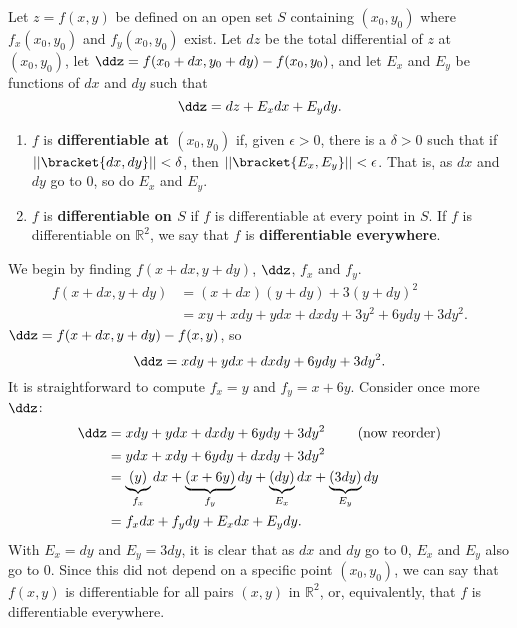 {Let $z=f(x,y)$ be defined on an open set $S$ containing $(x_0,y_0)$ where $f_x(x_0,y_0)$ and $f_y(x_0,y_0)$ exist. Let $dz$ be the total differential of $z$ at $(x_0,y_0)$, let $\ddz = f(x_0+dx,y_0+dy) - f(x_0,y_0)$, and let $E_x$ and $E_y$ be functions of $dx$ and $dy$  such that 
$$\ddz = dz + E_xdx + E_ydy.$$
\begin{enumerate}
	\item $f$ is \textbf{differentiable at $(x_0,y_0)$} if, given $\epsilon >0$, there is a $\delta >0$ such that if $||\bracket{dx,dy}|| < \delta$, then $||\bracket{E_x,E_y}|| < \epsilon$. That is, as $dx$ and $dy$ go to 0, so do $E_x$ and $E_y$.
	\item	$f$ is \textbf{differentiable on $S$} if $f$ is differentiable at every point in $S$. If $f$ is differentiable on $\mathbb{R}^2$, we say that $f$ is \textbf{differentiable everywhere}.
\end{enumerate}
}

{We begin by finding $f(x+dx,y+dy)$, $\ddz$, $f_x$ and $f_y$.
\begin{align*}
f(x+dx,y+dy) &= (x+dx)(y+dy) + 3(y+dy)^2 \\
						&= xy + xdy+ydx+dxdy + 3y^2+6ydy+3dy^2.
\end{align*}
$\ddz = f(x+dx,y+dy) - f(x,y)$, so
$$\ddz = xdy + ydx + dxdy + 6ydy+3dy^2.$$
It is straightforward to compute $f_x = y$ and $f_y = x+6y$. Consider once more $\ddz$:
\begin{align*}
\ddz &= xdy + ydx + dxdy + 6ydy+3dy^2 \qquad \text{ (now reorder)}\\
		&= ydx + xdy+6ydy+ dxdy + 3dy^2\\
		&= \underbrace{(y)}_{f_x}dx + \underbrace{(x+6y)}_{f_y}dy + \underbrace{(dy)}_{E_x}dx+\underbrace{(3dy)}_{E_y}dy\\
		&= f_xdx + f_ydy + E_xdx+E_ydy.
\end{align*}
With $E_x = dy$ and $E_y = 3dy$, it is clear that as $dx$ and $ dy$ go to 0, $E_x$ and $E_y$ also go to 0. Since this did not depend on a specific point $(x_0,y_0)$, we can say that $f(x,y)$ is differentiable for all pairs $(x,y)$ in $\mathbb{R}^2$, or, equivalently, that $f$ is differentiable everywhere. }

